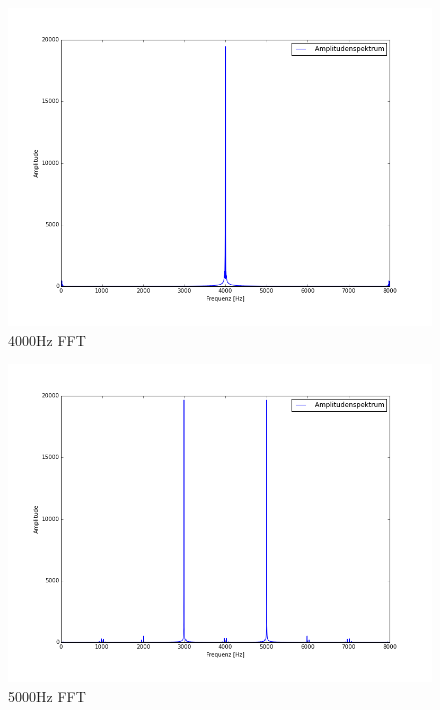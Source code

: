 \documentclass[12pt,oneside,a4paper]{report}
\begin{document}
\begin{figure}[H]
\centering\small
\includegraphics[scale=0.4]{src/4000fft.png}
\caption{4000Hz FFT}
\label{fig:4000_FFT}
\end{figure}

\begin{figure}[H]
\centering\small
\includegraphics[scale=0.4]{src/5000fft.png}
\caption{5000Hz FFT}
\label{fig:5000_FFT}
\end{figure}
\end{document}
